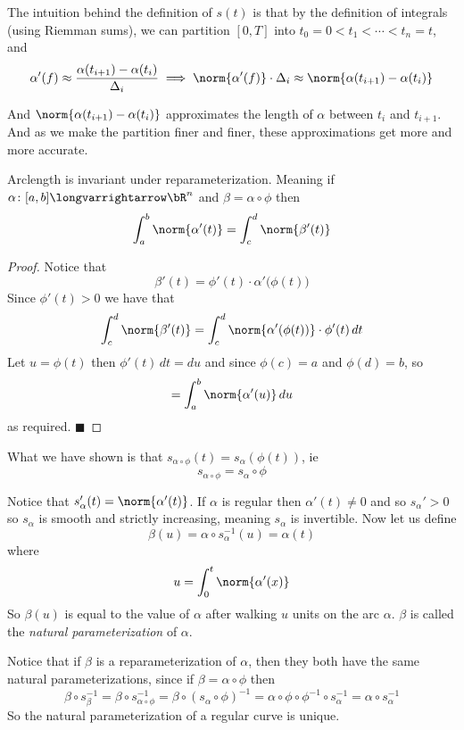 \documentclass[10pt]{article}
\let\longto=\longvarrightarrow
\def\qed{%
    \ifmmode%
        \eqno\blacksquare%
    \else%
        \hskip1cm\allowbreak\hbox{}\nobreak\hfill$\blacksquare$%
    \fi%
}
\begin{document}
The intuition behind the definition of $s(t)$ is that by the definition of integrals (using Riemman sums), we can partition $[0,T]$ into $t_0=0<t_1<\cdots<t_n=t$, and
\[ \alpha'(f) \approx \frac{\alpha(t_{i+1})-\alpha(t_i)}{\Delta_i} \implies \norm{\alpha'(f)}\cdot\Delta_i \approx \norm{\alpha(t_{i+1})-\alpha(t_i)} \]

\newpage
And $\norm{\alpha(t_{i+1})-\alpha(t_i)}$ approximates the length of $\alpha$ between $t_i$ and $t_{i+1}$.
And as we make the partition finer and finer, these approximations get more and more accurate.

\begin{prop*}

    Arclength is invariant under reparameterization.
    Meaning if $\alpha\colon[a,b]\longto\bR^n$ and $\beta=\alpha\circ\phi$ then
    \[ \int_a^b\norm{\alpha'(t)} = \int_c^d\norm{\beta'(t)} \]

\end{prop*}

\begin{proof}

    Notice that
    \[ \beta'(t) = \phi'(t)\cdot\alpha'\bigl(\phi(t)\bigr) \]
    Since $\phi'(t)>0$ we have that
    \[ \int_c^d\norm{\beta'(t)} = \int_c^d\norm{\alpha'(\phi(t))}\cdot\phi'(t)\,dt \]
    Let $u=\phi(t)$ then $\phi'(t)\,dt=du$ and since $\phi(c)=a$ and $\phi(d)=b$, so
    \[ = \int_a^b\norm{\alpha'(u)}\,du \]
    as required.
    \qed

\end{proof}

What we have shown is that $s_{\alpha\circ\phi}(t)=s_\alpha(\phi(t))$, ie
\[ s_{\alpha\circ\phi} = s_\alpha\circ\phi \]

Notice that $s_\alpha'(t)=\norm{\alpha'(t)}$.
If $\alpha$ is regular then $\alpha'(t)\neq0$ and so $s_\alpha'>0$ so $s_\alpha$ is smooth and strictly increasing, meaning $s_\alpha$ is invertible.
Now let us define
\[ \beta(u) = \alpha\circ s_\alpha^{-1}(u) = \alpha(t) \]
where
\[ u = \int_0^t \norm{\alpha'(x)} \]
So $\beta(u)$ is equal to the value of $\alpha$ after walking $u$ units on the arc $\alpha$.
$\beta$ is called the \emph{natural parameterization} of $\alpha$.

Notice that if $\beta$ is a reparameterization of $\alpha$, then they both have the same natural parameterizations, since if $\beta=\alpha\circ\phi$ then
\[ \beta\circ s_\beta^{-1} = \beta\circ s_{\alpha\circ\phi}^{-1} = \beta\circ(s_\alpha\circ\phi)^{-1} = \alpha\circ\phi\circ\phi^{-1}\circ s_\alpha^{-1} = \alpha\circ s_\alpha^{-1} \]
So the natural parameterization of a regular curve is unique.
\end{document}
